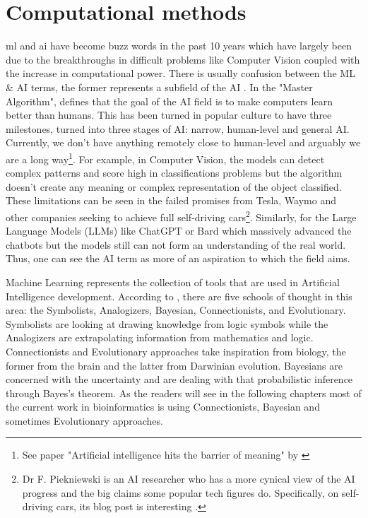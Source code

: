 \section{Computational methods} \label{s:computational}


\acrfull{ml} and \acrfull{ai} have become buzz words in the past 10 years which have largely been due to the breakthroughs in difficult problems like Computer Vision\cite{Krizhevsky2012-qa} coupled with the increase in computational power. There is usually confusion between the ML \& AI terms, the former represents a subfield of the AI \cite{Domingos_Pedro2015-xr}. In the "Master Algorithm", \citet{Domingos_Pedro2015-xr} defines that the goal of the AI field is to make computers learn better than humans. This has been turned in popular culture to have three milestones, turned into three stages of AI: narrow, human-level and general AI. Currently, we don't have anything remotely close to human-level and arguably we are a long way\footnote{See paper "Artificial intelligence hits the barrier of meaning" by \citet{Mitchell2019-hv}}. For example, in Computer Vision, the models can detect complex patterns and score high in classifications problems but the algorithm doesn't create any meaning or complex representation of the object classified. These limitations can be seen in the failed promises from Tesla, Waymo and other companies seeking to achieve full self-driving cars\footnote{Dr F. Piekniewski is an AI researcher who has a more cynical view of the AI progress and the big claims some popular tech figures do. Specifically, on self-driving cars, its blog post is interesting \cite{Piekniewski2021-if}.}.  Similarly, for the Large Language Models (LLMs) like ChatGPT or Bard which massively advanced the chatbots but the models still can not form an understanding of the real world. Thus, one can see the AI term as more of an aspiration to which the field aims.

Machine Learning represents the collection of tools that are used in Artificial Intelligence development. According to \citet{Domingos_Pedro2015-xr}, there are five schools of thought in this area: the Symbolists, Analogizers, Bayesian, Connectionists, and Evolutionary. Symbolists are looking at drawing knowledge from logic symbols while the Analogizers are extrapolating information from mathematics and logic\cite{Domingos_Pedro2015-xr}. Connectionists and Evolutionary approaches take inspiration from biology, the former from the brain and the latter from Darwinian evolution. Bayesians are concerned with the uncertainty and are dealing with that probabilistic inference through Bayes's theorem\cite{Domingos_Pedro2015-xr}. As the readers will see in the following chapters most of the current work in bioinformatics is using Connectionists, Bayesian and sometimes Evolutionary approaches.

